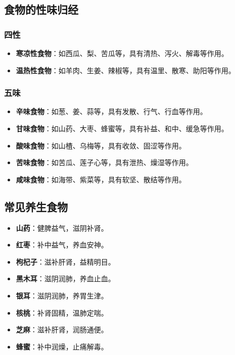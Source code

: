 \documentclass[12pt,UTF8]{ctexbook}
\begin{document}
\subsection{食物的性味归经}

\subsubsection{四性}

\begin{itemize}
\item \textbf{寒凉性食物}：如西瓜、梨、苦瓜等，具有清热、泻火、解毒等作用。
\item \textbf{温热性食物}：如羊肉、生姜、辣椒等，具有温里、散寒、助阳等作用。
\end{itemize}

\subsubsection{五味}

\begin{itemize}
\item \textbf{辛味食物}：如葱、姜、蒜等，具有发散、行气、行血等作用。
\item \textbf{甘味食物}：如山药、大枣、蜂蜜等，具有补益、和中、缓急等作用。
\item \textbf{酸味食物}：如山楂、乌梅等，具有收敛、固涩等作用。
\item \textbf{苦味食物}：如苦瓜、莲子心等，具有泄热、燥湿等作用。
\item \textbf{咸味食物}：如海带、紫菜等，具有软坚、散结等作用。
\end{itemize}

\subsection{常见养生食物}

\begin{itemize}
\item \textbf{山药}：健脾益气，滋阴补肾。
\item \textbf{红枣}：补中益气，养血安神。
\item \textbf{枸杞子}：滋补肝肾，益精明目。
\item \textbf{黑木耳}：滋阴润肺，养血止血。
\item \textbf{银耳}：滋阴润肺，养胃生津。
\item \textbf{核桃}：补肾固精，温肺定喘。
\item \textbf{芝麻}：滋补肝肾，润肠通便。
\item \textbf{蜂蜜}：补中润燥，止痛解毒。
\end{itemize}
\end{document}
